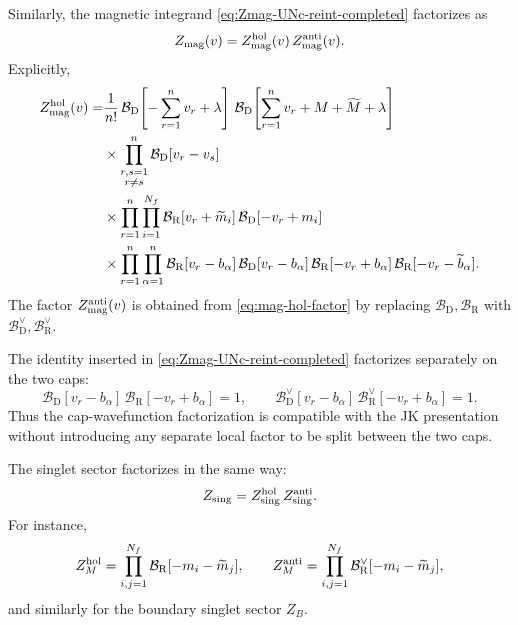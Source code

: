 \documentclass[11pt,a4paper]{article}
\numberwithin{equation}{section}
\theoremstyle{plain}
\theoremstyle{definition}
\theoremstyle{remark}
\begin{document}
Similarly, the magnetic integrand \eqref{eq:Zmag-UNc-reint-completed} factorizes as
\begin{equation}
Z_{\rm mag}(v)
=
Z_{\rm mag}^{\rm hol}(v)\,
Z_{\rm mag}^{\rm anti}(v).
\label{eq:mag-factorization}
\end{equation}
Explicitly,
\begin{equation}
\begin{aligned}
Z_{\rm mag}^{\rm hol}(v)
=&\frac{1}{n!}\,
\mathcal B_{\mathrm D}\!\left[-\sum_{r=1}^{n}v_r+\lambda\right]\,
\mathcal B_{\mathrm D}\!\left[\sum_{r=1}^{n}v_r+M+\widetilde M+\lambda\right]
\\
&\times
\prod_{\substack{r,s=1\\ r\neq s}}^{n}
\mathcal B_{\mathrm D}[v_r-v_s]
\\
&\times
\prod_{r=1}^{n}\prod_{i=1}^{N_f}
\mathcal B_{\mathrm R}[v_r+\widetilde m_i]\,
\mathcal B_{\mathrm D}[-v_r+m_i]
\\
&\times
\prod_{r=1}^{n}\prod_{\alpha=1}^{n}
\mathcal B_{\mathrm R}[v_r-b_\alpha]\,
\mathcal B_{\mathrm D}[v_r-b_\alpha]\,
\mathcal B_{\mathrm R}[-v_r+b_\alpha]\,
\mathcal B_{\mathrm R}[-v_r-\widetilde b_\alpha].
\end{aligned}
\label{eq:mag-hol-factor}
\end{equation}
The factor \(Z_{\rm mag}^{\rm anti}(v)\) is obtained from \eqref{eq:mag-hol-factor} by replacing \(\mathcal B_{\mathrm D},\mathcal B_{\mathrm R}\) with \(\mathcal B_{\mathrm D}^{\vee},\mathcal B_{\mathrm R}^{\vee}\).

The identity inserted in \eqref{eq:Zmag-UNc-reint-completed} factorizes separately on the two caps:
\begin{equation}
\mathcal B_{\mathrm D}[v_r-b_\alpha]\,
\mathcal B_{\mathrm R}[-v_r+b_\alpha]
=1,
\qquad
\mathcal B_{\mathrm D}^{\vee}[v_r-b_\alpha]\,
\mathcal B_{\mathrm R}^{\vee}[-v_r+b_\alpha]
=1 .
\label{eq:factorization-half-block-invertible-pairs}
\end{equation}
Thus the cap-wavefunction factorization is compatible with the JK presentation without introducing any separate local factor to be split between the two caps.

The singlet sector factorizes in the same way:
\begin{equation}
Z_{\rm sing}
=
Z_{\rm sing}^{\rm hol}\,
Z_{\rm sing}^{\rm anti}.
\label{eq:singlet-factorization}
\end{equation}
For instance,
\begin{equation}
Z_M^{\rm hol}
=
\prod_{i,j=1}^{N_f}
\mathcal B_{\mathrm R}[-m_i-\widetilde m_j],
\qquad
Z_M^{\rm anti}
=
\prod_{i,j=1}^{N_f}
\mathcal B_{\mathrm R}^{\vee}[-m_i-\widetilde m_j],
\end{equation}
and similarly for the boundary singlet sector \(Z_B\).
\end{document}
